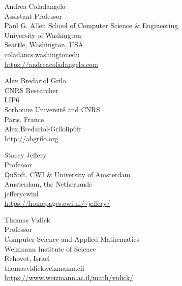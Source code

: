 \documentclass{toc}
\begin{document}
 
 

   

%
%
%



\begin{tocauthors}
\begin{tocinfo}[coladangelo]
 Andrea Coladangelo\\
 Assistant Professor\\
 Paul G. Allen School of Computer Science \& Engineering\\
 University of Washington\\
 Seattle, Washington, USA\\
 coladan\tocat{}cs.washington\tocdot{}edu\\   
\url{https://andreacoladangelo.com}
\end{tocinfo}
\begin{tocinfo}[grilo]
 Alex Bredariol Grilo\\
 CNRS Researcher\\
 LIP6\\
 Sorbonne Universit\'e and CNRS\\
 Paris, France\\
 Alex.Bredariol-Grilo\tocat{}lip6\tocdot{}fr \\ 
 \url{http://abgrilo.org}  %
\end{tocinfo}
\begin{tocinfo}[jeffery]
 Stacey Jeffery\\
 Professor\\
 QuSoft, CWI \& University of Amsterdam\\
 Amsterdam, the Netherlands\\
 jeffery\tocat{}cwi\tocdot{}nl \\   
\url{https://homepages.cwi.nl/~jeffery/}      
\end{tocinfo}
\begin{tocinfo}[vidick]
 Thomas Vidick\\  %
 Professor\\
 Computer Science and Applied Mathematics\\
 Weizmann Institute of Science\\  
 Rehovot, Israel\\
 thomas\tocdot{}vidick\tocat{}weizmann\tocdot{}ac\tocdot{}il \\ %
\url{https://www.weizmann.ac.il/math/vidick/}  %
\end{tocinfo}
\end{tocauthors}
\end{document}
